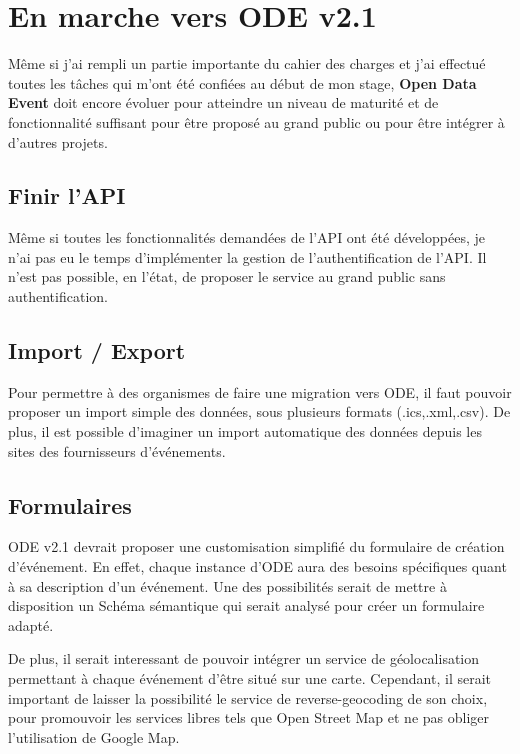 \section{En marche vers ODE v2.1}

Même si j'ai rempli un partie importante du cahier des charges et j'ai effectué toutes les tâches qui m'ont été confiées au début de mon stage, \textbf{Open Data Event} doit encore évoluer pour atteindre un niveau de maturité et de fonctionnalité suffisant pour être proposé au grand public ou pour être intégrer à d'autres projets.

\subsection{Finir l'API}

Même si toutes les fonctionnalités demandées de l'API ont été développées, je n'ai pas eu le temps d'implémenter la gestion de l'authentification de l'API. Il n'est pas possible, en l'état, de proposer le service au grand public sans authentification.

\subsection{Import / Export}

Pour permettre à des organismes de faire une migration vers ODE, il faut pouvoir proposer un import simple des données, sous plusieurs formats (.ics,.xml,.csv). De plus, il est possible d'imaginer un import automatique des données depuis les sites des fournisseurs d'événements.

\subsection{Formulaires}

ODE v2.1 devrait proposer une customisation simplifié du formulaire de création d'événement. En effet, chaque instance d'ODE aura des besoins spécifiques quant à sa description d'un événement.
Une des possibilités serait de mettre à disposition un Schéma sémantique qui serait analysé pour créer un formulaire adapté.

De plus, il serait interessant de pouvoir intégrer un service de géolocalisation permettant à chaque événement d'être situé sur une carte. Cependant, il serait important de laisser la possibilité le service de reverse-geocoding de son choix, pour promouvoir les services libres tels que Open Street Map et ne pas obliger l'utilisation de Google Map.

